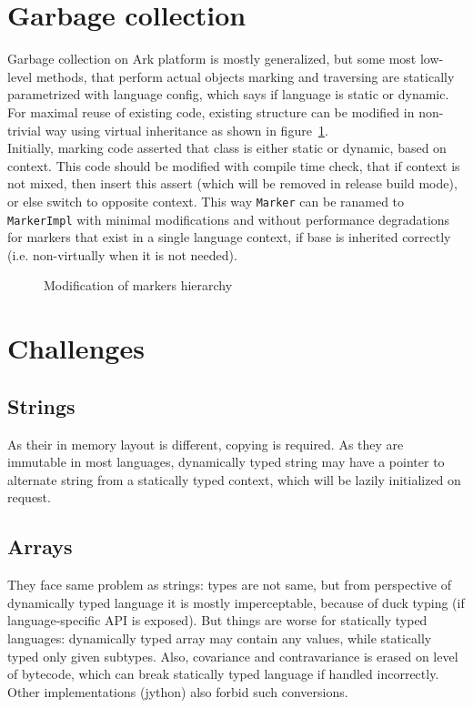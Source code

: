 \documentclass[times, %
               specification,annotation, %
               titlepage-extra-ru,specification-extra-ru,annotation-extra-ru, %
               languages={russian,english} %
              ]{itmo-student-thesis}
\begin{document}
\section{Garbage collection}
Garbage collection on Ark platform is mostly generalized, but some most low-level methods, that perform actual objects marking and traversing are statically parametrized with language config, which says if language is static or dynamic. For maximal reuse of existing code, existing structure can be modified in non-trivial way using virtual inheritance as shown in figure~\ref{fig:gc-markers}.\\
Initially, marking code asserted that class is either static or dynamic, based on context. This code should be modified with compile time check, that if context is not mixed, then insert this assert (which will be removed in release build mode), or else switch to opposite context. This way \texttt{Marker} can be ranamed to \texttt{MarkerImpl} with minimal modifications and without performance degradations for markers that exist in a single language context, if base is inherited correctly (i.e. non-virtually when it is not needed).\\
\begin{figure}[H]
\caption{Modification of markers hierarchy}\label{fig:gc-markers}
\centering
\end{figure}

\section{Challenges}
\subsection{Strings}
As their in memory layout is different, copying is required. As they are immutable in most languages, dynamically typed string may have a pointer to alternate string from a statically typed context, which will be lazily initialized on request.
\subsection{Arrays}
They face same problem as strings: types are not same, but from perspective of dynamically typed language it is mostly imperceptable, because of duck typing (if language-specific API is exposed). But things are worse for statically typed languages: dynamically typed array may contain any values, while statically typed only given subtypes. Also, covariance and contravariance is erased on level of bytecode, which can break statically typed language if handled incorrectly. Other implementations (jython) also forbid such conversions.
\end{document}
